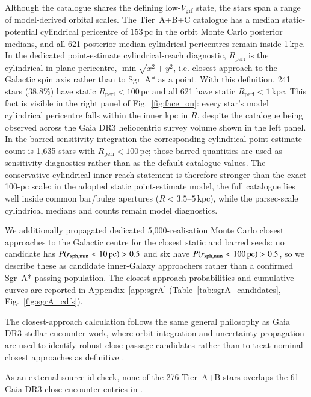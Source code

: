 \documentclass{aa}  %
\newcommand{\vgrf}{\ensuremath{V_{\mathrm{grf}}}\xspace}
\newcommand{\kpc}{\ensuremath{\,\mathrm{kpc}}\xspace}
\newcommand{\Rperi}{R_{\mathrm{peri}}}
\begin{document}
Although the catalogue shares the defining low-\vgrf{} state, the stars
span a range of model-derived orbital scales.  The Tier~A+B+C catalogue
 has a median static-potential cylindrical pericentre of 153\,pc in the orbit
Monte Carlo posterior medians, and all 621 posterior-median
 cylindrical pericentres remain inside 1\,kpc.  In the dedicated point-estimate
 cylindrical-reach diagnostic, $\Rperi$ is the cylindrical in-plane
pericentre, $\min\sqrt{x^2+y^2}$, i.e. closest approach to the Galactic
spin axis rather than to Sgr~A* as a point.  With this definition,
241 stars ($38.8\%$) have static $\Rperi<100$\,pc and all 621 have static
$\Rperi<1$\kpc.  This fact is visible in the
 right panel of Fig.~\ref{fig:face_on}: every star's model cylindrical
 pericentre falls within the inner kpc in $R$, despite the catalogue
being observed across the Gaia DR3 heliocentric survey volume shown in
the left panel.  In the barred
sensitivity integration the corresponding cylindrical point-estimate
count is 1{,}635 stars with $\Rperi<100$\,pc; those barred quantities
are used as sensitivity diagnostics rather than as the default catalogue
 values.  The conservative cylindrical inner-reach statement is therefore stronger
than the exact 100-pc scale: in the adopted static point-estimate model,
the full catalogue lies well inside common bar/bulge apertures
 ($R<3.5$--$5$\kpc), while the parsec-scale cylindrical medians and counts remain
model diagnostics.


We additionally propagated dedicated 5{,}000-realisation Monte Carlo
closest approaches to the Galactic centre for the closest static and
barred seeds: no candidate has $P(r_{\rm sph,min}<10\,{\rm pc})>0.5$ and
six have $P(r_{\rm sph,min}<100\,{\rm pc})>0.5$, so we describe these as
candidate inner-Galaxy approachers rather than a confirmed
Sgr~A*-passing population. The closest-approach probabilities and
cumulative curves are reported in Appendix~\ref{app:sgrA}
(Table~\ref{tab:sgrA_candidates}, Fig.~\ref{fig:sgrA_cdfs}).

The closest-approach calculation follows the same general philosophy as
Gaia DR3 stellar-encounter work, where orbit integration and uncertainty
propagation are used to identify robust close-passage candidates rather
than to treat nominal closest approaches as definitive
\citep{BailerJones2022}.

As an external source-id check, none of the 276 Tier~A+B stars overlaps
the 61 Gaia DR3 close-encounter entries in \citet{BailerJones2022}.
\end{document}
